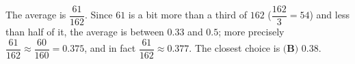 The average is $\dfrac{61}{162}$. Since $61$ is a bit more than a third of $162$ ($\dfrac{162}{3}=54$) and less than half of it, the average is between $0.33$ and $0.5$; more precisely $\dfrac{61}{162}\approx\dfrac{60}{160}=0.375$, and in fact $\dfrac{61}{162}\approx0.377$. The closest choice is $\boxed{\textbf{(B) }0.38}$.
